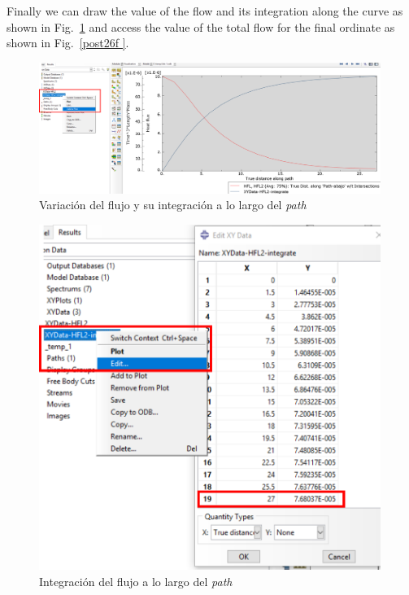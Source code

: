 \begin{itemize}
  Finally we can draw the value of the flow and its integration along the curve as shown in Fig.~\ref{post26e} and access the value of the total flow for the final ordinate as shown in Fig.~\ref{post26f }.
     \begin{figure}[!h]
    \begin{center}
      \includegraphics[width=0.99\textwidth]{./body/images/post26e.pdf}
    \end{center}
    \caption{Variación del flujo y su integración a lo largo del \textit{path}}
    \label{post26e}
  \end{figure}
      \begin{figure}[!h]
    \begin{center}
      \includegraphics[width=0.99\textwidth]{./body/images/post26f.pdf}
    \end{center}
    \caption{Integración del flujo a lo largo del \textit{path}}
    \label{post26f}
  \end{figure}



\end{itemize}
